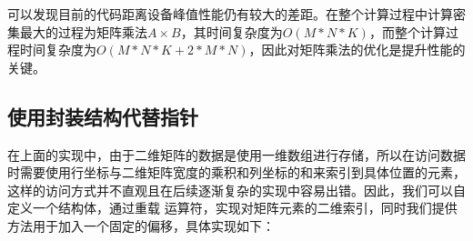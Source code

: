 \documentclass[letterpaper,10pt,english]{sphinxmanual}
\begin{document}
\sphinxAtStartPar
可以发现目前的代码距离设备峰值性能仍有较大的差距。在整个计算过程中计算密集最大的过程为矩阵乘法\(A\times B\)，其时间复杂度为\(O(M*N*K)\)，而整个计算过程时间复杂度为\(O(M*N*K+2*M*N)\)，因此对矩阵乘法的优化是提升性能的关键。


\subsection{使用封装结构代替指针}
\label{\detokenize{chapter_accelerator/accelerator_practise:id4}}
\sphinxAtStartPar
在上面的实现中，由于二维矩阵的数据是使用一维数组进行存储，所以在访问数据时需要使用行坐标与二维矩阵宽度的乘积和列坐标的和来索引到具体位置的元素，这样的访问方式并不直观且在后续逐渐复杂的实现中容易出错。因此，我们可以自定义一个结构体，通过重载
\sphinxcode{\sphinxupquote{()}} 运算符，实现对矩阵元素的二维索引，同时我们提供 
方法用于加入一个固定的偏移，具体实现如下：
\end{document}
